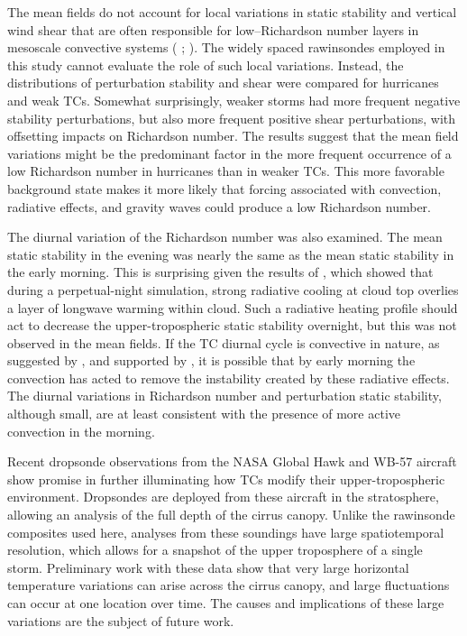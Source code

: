 The mean fields do not account for local variations in static stability and vertical wind shear that are often responsible for low--Richardson number layers in mesoscale convective systems (\citeauthor{Lenzetal2009} \citeyear{Lenzetal2009}; \citeauthor{Trieretal2010} \citeyear{Trieretal2010}).
The widely spaced rawinsondes employed in this study cannot evaluate the role of such local variations.
Instead, the distributions of perturbation stability and shear were compared for hurricanes and weak TCs.
Somewhat surprisingly, weaker storms had more frequent negative stability perturbations, but also more frequent positive shear perturbations, with offsetting impacts on Richardson number.
The results suggest that the mean field variations might be the predominant factor in the more frequent occurrence of a low Richardson number in hurricanes than in weaker TCs.
This more favorable background state makes it more likely that forcing associated with convection, radiative effects, and gravity waves could produce a low Richardson number.

The diurnal variation of the Richardson number was also examined. The mean static stability in the evening was nearly the same as the mean static stability in the early morning.
This is surprising given the results of \cite{MelhauserZhang2014}, which showed that during a perpetual-night simulation, strong radiative cooling at cloud top overlies a layer of longwave warming within cloud.
Such a radiative heating profile should act to decrease the upper-tropospheric static stability overnight, but this was not observed in the mean fields.
If the TC diurnal cycle is convective in nature, as suggested by \cite{Dunionetal2014}, and supported by \cite{BowmanFowler2015}, it is possible that by early morning the convection has acted to remove the instability created by these radiative effects.
The diurnal variations in Richardson number and perturbation static stability, although small, are at least consistent with the presence of more active convection in the morning.

Recent dropsonde observations from the NASA Global Hawk and WB-57 aircraft show promise in further illuminating how TCs modify their upper-tropospheric environment.
Dropsondes are deployed from these aircraft in the stratosphere, allowing an analysis of the full depth of the cirrus canopy.
Unlike the rawinsonde composites used here, analyses from these soundings have large spatiotemporal resolution, which allows for a snapshot of the upper troposphere of a single storm.
Preliminary work with these data show that very large horizontal temperature variations can arise across the cirrus canopy, and large fluctuations can occur at one location over time.
The causes and implications of these large variations are the subject of future work.

